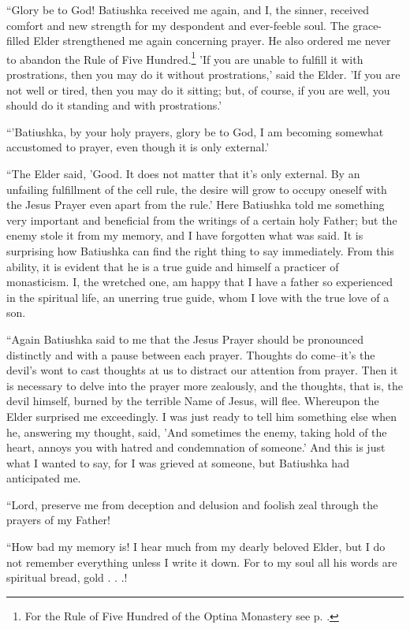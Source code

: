 “Glory be to God! Batiushka received me again, and I, the sinner, received comfort and new strength for my despondent and ever-feeble soul. The grace-filled Elder strengthened me again concerning prayer. He also ordered me never to abandon the Rule of Five Hundred.\footnote{For the Rule of Five Hundred of the Optina Monastery see p. \pageref{cell-rule}.} 'If you are unable to fulfill it with prostrations, then you may do it without prostrations,' said the Elder. 'If you are not well or tired, then you may do it sitting; but, of course, if you are well, you should do it standing and with prostrations.'

“'Batiushka, by your holy prayers, glory be to God, I am becoming somewhat accustomed to prayer, even though it is only external.'

“The Elder said, 'Good. It does not matter that it's only external. By an unfailing fulfillment of the cell rule, the desire will grow to occupy oneself with the Jesus Prayer even apart from the rule.' Here Batiushka told me something very important and beneficial from the writings of a certain holy Father; but the enemy stole it from my memory, and I have forgotten what was said. It is surprising how Batiushka can find the right thing to say immediately. From this ability, it is evident that he is a true guide and himself a practicer of monasticism. I, the wretched one, am happy that I have a father so experienced in the spiritual life, an unerring true guide, whom I love with the true love of a son.

“Again Batiushka said to me that the Jesus Prayer should be pronounced distinctly and with a pause between each prayer. Thoughts do come--it's the devil's wont to cast thoughts at us to distract our attention from prayer. Then it is necessary to delve into the prayer more zealously, and the thoughts, that is, the devil himself, burned by the terrible Name of Jesus, will flee. Whereupon the Elder surprised me exceedingly. I was just ready to tell him something else when he, answering my thought, said, 'And sometimes the enemy, taking hold of the heart, annoys you with hatred and condemnation of someone.' And this is just what I wanted to say, for I was grieved at someone, but Batiushka had anticipated me.

“Lord, preserve me from deception and delusion and foolish zeal through the prayers of my Father!

“How bad my memory is! I hear much from my dearly beloved Elder, but I do not remember everything unless I write it down. For to my soul all his words are spiritual bread, gold . . .!

